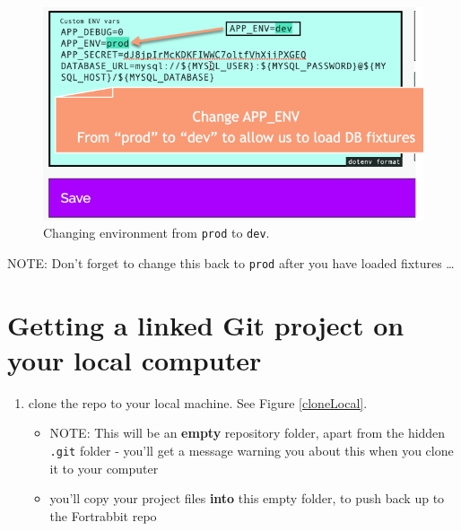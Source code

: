 \documentclass[a4paperpaper,openright]{book}
\begin{document}
\begin{figure}
\centering
\includegraphics{./tex2pdf.-05a85d9d563be472/894c4dc95e174f508236060fa5116ee86653942c.png}
\caption{Changing environment from \texttt{prod} to \texttt{dev}.
\label{devEnvironment}}
\end{figure}

NOTE: Don't forget to change this back to \texttt{prod} after you have
loaded fixtures \ldots{}

\hypertarget{getting-a-linked-git-project-on-your-local-computer}{%
\section{Getting a linked Git project on your local
computer}\label{getting-a-linked-git-project-on-your-local-computer}}

\begin{enumerate}
\def\labelenumi{\arabic{enumi}.}
\item
  clone the repo to your local machine. See Figure \ref{cloneLocal}.

  \begin{itemize}
  \item
    NOTE: This will be an \textbf{empty} repository folder, apart from
    the hidden \texttt{.git} folder - you'll get a message warning you
    about this when you clone it to your computer
  \item
    you'll copy your project files \textbf{into} this empty folder, to
    push back up to the Fortrabbit repo
  \end{itemize}
\end{enumerate}
\end{document}
